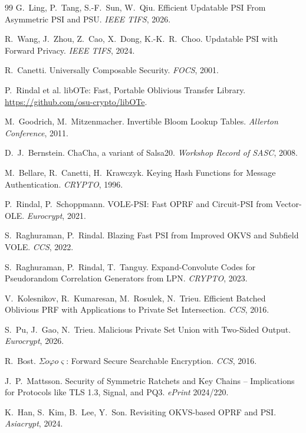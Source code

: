 \begin{thebibliography}{99}
 G.~Ling, P.~Tang, S.-F.~Sun, W.~Qiu.
\newblock Efficient Updatable PSI From Asymmetric PSI and PSU. \emph{IEEE TIFS}, 2026.

 R.~Wang, J.~Zhou, Z.~Cao, X.~Dong, K.-K.~R.~Choo.
\newblock Updatable PSI with Forward Privacy. \emph{IEEE TIFS}, 2024.

 R.~Canetti.
\newblock Universally Composable Security. \emph{FOCS}, 2001.

 P.~Rindal et al.
\newblock libOTe: Fast, Portable Oblivious Transfer Library. \url{https://github.com/osu-crypto/libOTe}.

 M.~Goodrich, M.~Mitzenmacher.
\newblock Invertible Bloom Lookup Tables. \emph{Allerton Conference}, 2011.

 D.~J.~Bernstein.
\newblock ChaCha, a variant of Salsa20. \emph{Workshop Record of SASC}, 2008.

 M.~Bellare, R.~Canetti, H.~Krawczyk.
\newblock Keying Hash Functions for Message Authentication. \emph{CRYPTO}, 1996.

 P.~Rindal, P.~Schoppmann.
\newblock VOLE-PSI: Fast OPRF and Circuit-PSI from Vector-OLE. \emph{Eurocrypt}, 2021.

 S.~Raghuraman, P.~Rindal.
\newblock Blazing Fast PSI from Improved OKVS and Subfield VOLE. \emph{CCS}, 2022.

 S.~Raghuraman, P.~Rindal, T.~Tanguy.
\newblock Expand-Convolute Codes for Pseudorandom Correlation Generators from LPN. \emph{CRYPTO}, 2023.

 V.~Kolesnikov, R.~Kumaresan, M.~Rosulek, N.~Trieu.
\newblock Efficient Batched Oblivious PRF with Applications to Private Set Intersection. \emph{CCS}, 2016.

 S.~Pu, J.~Gao, N.~Trieu.
\newblock Malicious Private Set Union with Two-Sided Output. \emph{Eurocrypt}, 2026.

 R.~Bost.
\newblock $\Sigma o\varphi o\varsigma$: Forward Secure Searchable Encryption. \emph{CCS}, 2016.

 J.~P.~Mattsson.
\newblock Security of Symmetric Ratchets and Key Chains -- Implications for Protocols like TLS 1.3, Signal, and PQ3. \emph{ePrint} 2024/220.

 K.~Han, S.~Kim, B.~Lee, Y.~Son.
\newblock Revisiting OKVS-based OPRF and PSI. \emph{Asiacrypt}, 2024.


\end{thebibliography}
